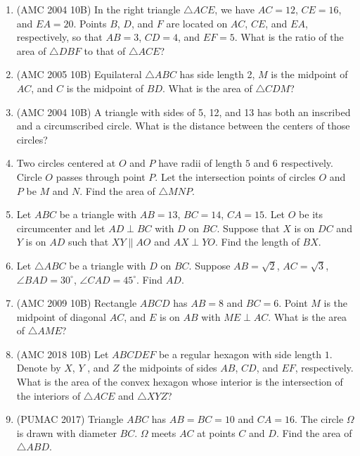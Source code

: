 \documentclass[12pt]{scrartcl}
\begin{document}
\begin{enumerate}
    \item (AMC 2004 10B) In the right triangle $\triangle ACE$, we have $AC = 12$, $CE = 16$, and $EA = 20$. Points $B$, $D$, and $F$ are located on $AC$, $CE$, and $EA$, respectively, so that $AB = 3$, $CD = 4$, and $EF = 5$. What is the ratio of the area of $\triangle DBF$ to that of $\triangle ACE$?

    \item (AMC 2005 10B) Equilateral $\triangle ABC$ has side length 2, $M$ is the midpoint of $AC$, and $C$ is the midpoint of $BD$. What is the area of $\triangle CDM$?

    \item (AMC 2004 10B) A triangle with sides of 5, 12, and 13 has both an inscribed and a circumscribed circle. What is the distance between the centers of those circles?

    \item Two circles centered at $O$ and $P$ have radii of length $5$ and $6$ respectively. Circle $O$ passes through point $P$. Let the intersection points of circles $O$ and $P$ be $M$ and $N$. Find the area of $\triangle MNP$.

    \item Let $ABC$ be a triangle with $AB = 13$, $BC = 14$, $CA = 15$. Let $O$ be its circumcenter and let $AD \perp BC$ with $D$ on $BC$. Suppose that $X$ is on $DC$ and $Y$ is on $AD$ such that $XY \parallel AO$ and $AX \perp YO$. Find the length of $BX$.

    \item Let $\triangle ABC$ be a triangle with $D$ on $BC$. Suppose $AB = \sqrt{2}$, $AC = \sqrt{3}$, $\angle BAD = 30^\circ$, $\angle CAD = 45^\circ$. Find $AD$.

    \item (AMC 2009 10B) Rectangle $ABCD$ has $AB = 8$ and $BC = 6$. Point $M$ is the midpoint of diagonal $AC$, and $E$ is on $AB$ with $ME \perp AC$. What is the area of $\triangle AME$?


    \item (AMC 2018 10B) Let $ABCDEF$ be a regular hexagon with side length $1$. Denote by $X$, $Y$ , and $Z$ the midpoints of sides $AB$, $CD$, and $EF$, respectively. What is the area of the convex hexagon whose interior is the intersection of the interiors of $\triangle ACE$ and $\triangle XYZ$?


    \item (PUMAC 2017) Triangle $ABC$ has $AB = BC = 10$ and $CA = 16$. The circle $\Omega$ is drawn with diameter $BC$. $\Omega$ meets $AC$ at points $C$ and $D$. Find the area of $\triangle ABD$.



\end{enumerate}
\end{document}
